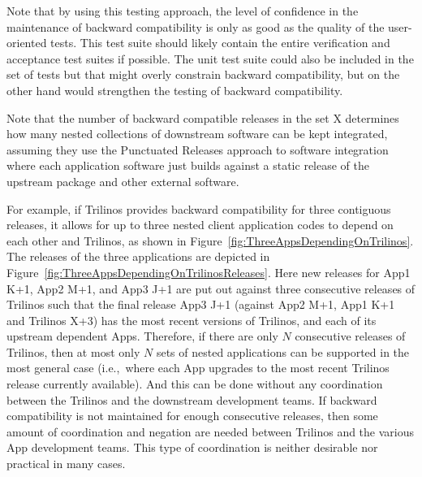 \documentclass[11pt]{SANDreport}
\begin{document}
Note that by using this testing approach, the level of confidence in the maintenance of backward compatibility is only as good as the quality of the user-oriented tests.  This test suite should likely contain the entire verification and acceptance test suites if possible.  The unit test suite could also be included in the set of tests but that might overly constrain backward compatibility, but on the other hand would strengthen the testing of backward compatibility.

Note that the number of backward compatible releases in the set X determines how many nested collections of downstream software can be kept integrated, assuming they use the Punctuated Releases approach to software integration {}\cite{SoftwareIntegrationforCSE09} where each application software just builds against a static release of the upstream package and other external software.

For example, if Trilinos provides backward compatibility for three contiguous releases, it allows for up to three nested client application codes to depend on each other and Trilinos, as shown in Figure~\ref{fig:ThreeAppsDependingOnTrilinos}.  The releases of the three applications are depicted in Figure~\ref{fig:ThreeAppsDependingOnTrilinosReleases}.  Here new releases for App1 K+1, App2 M+1, and App3 J+1 are put out against three consecutive releases of Trilinos such that the final release App3 J+1 (against App2 M+1, App1 K+1 and Trilinos X+3) has the most recent versions of Trilinos, and each of its upstream dependent Apps. Therefore, if there are only $N$ consecutive releases of Trilinos, then at most only $N$ sets of nested applications can be supported in the most general case (i.e.,\ where each App upgrades to the most recent Trilinos release currently available).  And this can be done without any coordination between the Trilinos and the downstream development teams.  If backward compatibility is not maintained for enough consecutive releases, then some amount of coordination and negation are needed between Trilinos and the various App development teams.  This type of coordination is neither desirable nor practical in many cases.
\end{document}

